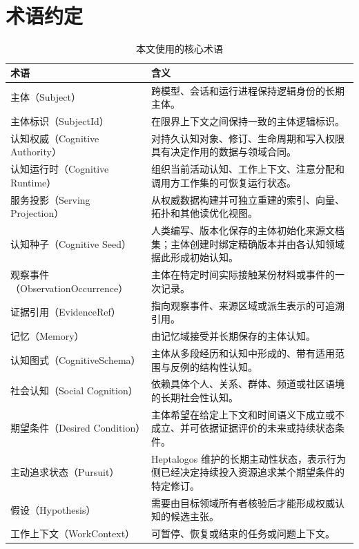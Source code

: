 \chapter*{术语约定}

\begin{longtable}{>{\raggedright\arraybackslash}p{4.0cm}>{\raggedright\arraybackslash}p{9.6cm}}
\caption{本文使用的核心术语}\label{tab:terminology}\\
\toprule
\textbf{术语} & \textbf{含义}\\
\midrule
主体（Subject） & 跨模型、会话和运行进程保持逻辑身份的长期主体。\\
主体标识（SubjectId） & 在限界上下文之间保持一致的主体逻辑标识。\\
认知权威（Cognitive Authority） & 对持久认知对象、修订、生命周期和写入权限具有决定作用的数据与领域合同。\\
认知运行时（Cognitive Runtime） & 组织当前活动认知、工作上下文、注意分配和调用方工作集的可恢复运行状态。\\
服务投影（Serving Projection） & 从权威数据构建并可独立重建的索引、向量、拓扑和其他读优化视图。\\
认知种子（Cognitive Seed） & 人类编写、版本化保存的主体初始化来源文档集；主体创建时绑定精确版本并由各认知领域据此形成初始认知。\\
观察事件（ObservationOccurrence） & 主体在特定时间实际接触某份材料或事件的一次记录。\\
证据引用（EvidenceRef） & 指向观察事件、来源区域或派生表示的可追溯引用。\\
记忆（Memory） & 由记忆域接受并长期保存的主体认知。\\
认知图式（CognitiveSchema） & 主体从多段经历和认知中形成的、带有适用范围与反例的结构性认知。\\
社会认知（Social Cognition） & 依赖具体个人、关系、群体、频道或社区语境的长期社会性认知。\\
期望条件（Desired Condition） & 主体希望在给定上下文和时间语义下成立或不成立、并可依据证据评价的未来或持续状态条件。\\
主动追求状态（Pursuit） & Heptalogos 维护的长期主动性状态，表示行为侧已经决定持续投入资源追求某个期望条件的特定修订。\\
假设（Hypothesis） & 需要由目标领域所有者核验后才能形成权威认知的候选主张。\\
工作上下文（WorkContext） & 可暂停、恢复或结束的任务或问题上下文。\\
\bottomrule
\end{longtable}
\clearpage
